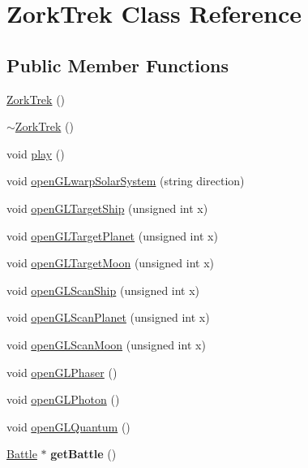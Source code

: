 \hypertarget{classZorkTrek}{
\section{ZorkTrek Class Reference}
\label{d6/df9/classZorkTrek}
}
\subsection*{Public Member Functions}
\begin{DoxyCompactItemize}
\item 
\hyperlink{classZorkTrek_afe7f77cf684870f7264b15431aa9ca9d}{ZorkTrek} ()
\item 
\hyperlink{classZorkTrek_aea71d65cb3ca6c07ca6c7cc63995e089}{$\sim$ZorkTrek} ()
\item 
void \hyperlink{classZorkTrek_aee046c36289fb0c839b58f55f4b786d5}{play} ()
\item 
void \hyperlink{classZorkTrek_ae7119994598bbf87319c33e10a5762b4}{openGLwarpSolarSystem} (string direction)
\item 
void \hyperlink{classZorkTrek_a8f33cd71700aa48a7b173557d2922228}{openGLTargetShip} (unsigned int x)
\item 
void \hyperlink{classZorkTrek_abc6d826f529f4681211a4ca76112d007}{openGLTargetPlanet} (unsigned int x)
\item 
void \hyperlink{classZorkTrek_a1c9ef271699144b716a83ddc550c54b5}{openGLTargetMoon} (unsigned int x)
\item 
void \hyperlink{classZorkTrek_ae1396640eabe5971dfe3c2d5a1d747ca}{openGLScanShip} (unsigned int x)
\item 
void \hyperlink{classZorkTrek_a6801854e2674fcac922dd61e07f39e95}{openGLScanPlanet} (unsigned int x)
\item 
void \hyperlink{classZorkTrek_accb64b4d5c3ed0e331d8d2fb698dd0ec}{openGLScanMoon} (unsigned int x)
\item 
void \hyperlink{classZorkTrek_ad099def5ec9fec3dfc2fccbbfc68f3bf}{openGLPhaser} ()
\item 
void \hyperlink{classZorkTrek_acd517289066e25a8541bbe74ac2dc74e}{openGLPhoton} ()
\item 
void \hyperlink{classZorkTrek_a9387185224b8d78b824a78b0f1a4e3ab}{openGLQuantum} ()
\item 
\hypertarget{classZorkTrek_a0ee0cb463294039b3feb4ab85997bb8f}{
\hyperlink{classBattle}{Battle} $\ast$ {\bfseries getBattle} ()}
\label{d6/df9/classZorkTrek_a0ee0cb463294039b3feb4ab85997bb8f}


\end{DoxyCompactItemize}
